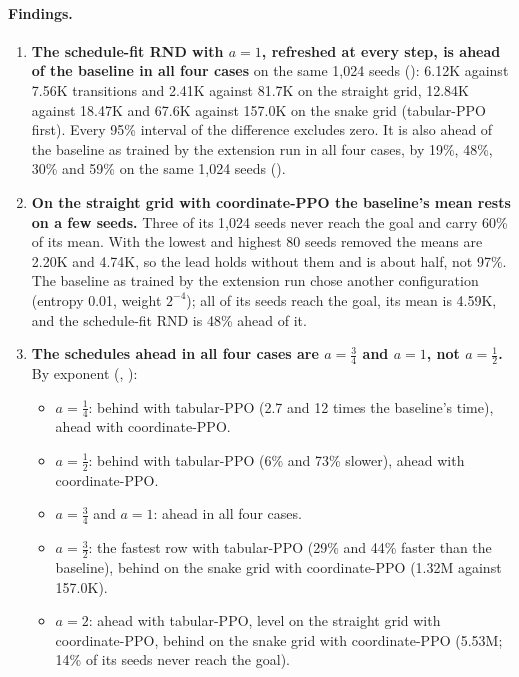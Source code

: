 \paragraph{Findings.}
\begin{enumerate}[leftmargin=*]
\item \textbf{The schedule-fit RND with $a=1$, refreshed at every step, is ahead of the baseline
in all four cases} on the same 1,024 seeds (): 6.12K
against 7.56K transitions and 2.41K against 81.7K on the straight grid, 12.84K against 18.47K and
67.6K against 157.0K on the snake grid (tabular-PPO first). Every 95\% interval of the difference
excludes zero. It is also ahead of the baseline as trained by the extension run in all four
cases, by 19\%, 48\%, 30\% and 59\% on the same 1,024 seeds
().
\item \textbf{On the straight grid with coordinate-PPO the baseline's mean rests on a few seeds.}
Three of its 1,024 seeds never reach the goal and carry 60\% of its mean. With the lowest and
highest 80 seeds removed the means are 2.20K and 4.74K, so the lead holds without them and is
about half, not 97\%. The baseline as trained by the extension run chose another configuration
(entropy 0.01, weight $2^{-4}$); all of its seeds reach the goal, its mean is 4.59K, and the
schedule-fit RND is 48\% ahead of it.
\item \textbf{The schedules ahead in all four cases are $a=\tfrac34$ and $a=1$, not
$a=\tfrac12$.} By exponent (,
):
\begin{itemize}[leftmargin=*]
\item $a=\tfrac14$: behind with tabular-PPO (2.7 and 12 times the baseline's time), ahead with
coordinate-PPO.
\item $a=\tfrac12$: behind with tabular-PPO (6\% and 73\% slower), ahead with coordinate-PPO.
\item $a=\tfrac34$ and $a=1$: ahead in all four cases.
\item $a=\tfrac32$: the fastest row with tabular-PPO (29\% and 44\% faster than the baseline),
behind on the snake grid with coordinate-PPO (1.32M against 157.0K).
\item $a=2$: ahead with tabular-PPO, level on the straight grid with coordinate-PPO, behind on
the snake grid with coordinate-PPO (5.53M; 14\% of its seeds never reach the goal).
\end{itemize}

\end{enumerate}
